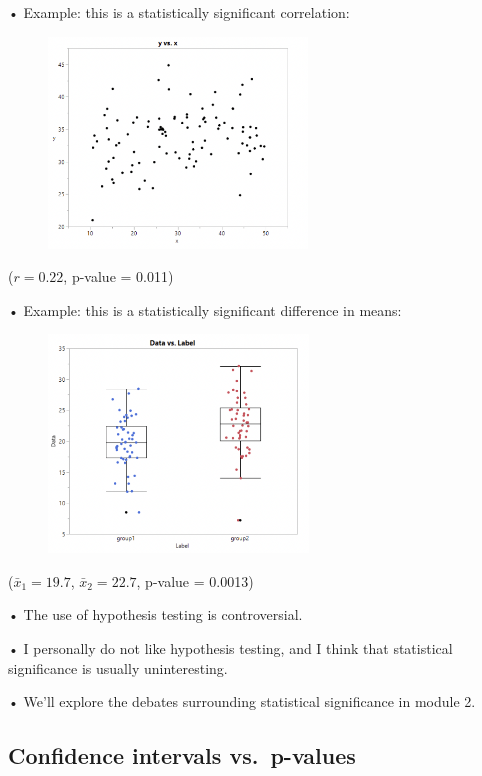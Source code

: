 \documentclass[
  letterpaper,
  DIV=11,
  numbers=noendperiod]{scrreprt}
\begin{document}
• Example: this is a statistically significant correlation:

\begin{figure}

\includegraphics[width=2.70833in,height=\textheight]{images/mod1_13.png} \hfill{}

\end{figure}

(\(r = 0.22\), p-value = 0.011)

• Example: this is a statistically significant difference in means:

\begin{figure}

\includegraphics[width=2.71875in,height=\textheight]{images/mod1_14.png} \hfill{}

\end{figure}

(\(\bar{x}_1 = 19.7\), \(\bar{x}_2 = 22.7\), p-value = 0.0013)

• The use of hypothesis testing is controversial.

• I personally do not like hypothesis testing, and I think that
statistical significance is usually uninteresting.

• We'll explore the debates surrounding statistical significance in
module 2.

\hypertarget{confidence-intervals-vs.-p-values}{%
\subsection{Confidence intervals
vs.~p-values}\label{confidence-intervals-vs.-p-values}}
\end{document}
